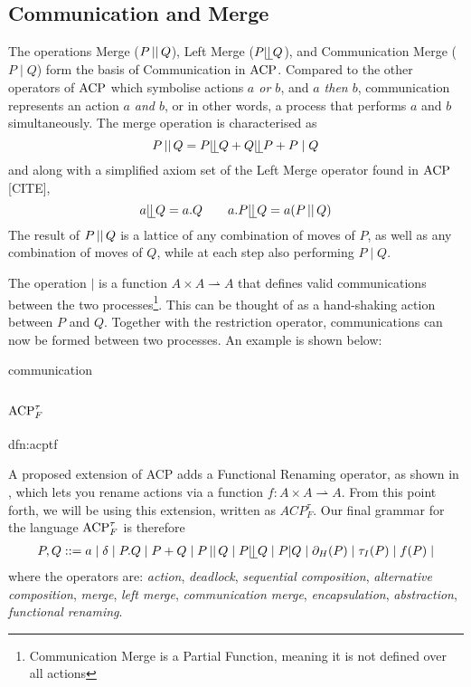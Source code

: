\documentclass[../hons_project.tex]{subfiles}
\begin{document}
\subsection{Communication and Merge}\label{ssec:acp-communication}
The operations Merge ($P \merge Q$), Left Merge ($P \leftmerge Q$), and Communication Merge ($P \mid Q$) form the basis of Communication in $\acp$. Compared to the other operators of $\acp$ which symbolise actions \textit{$a$ or $b$}, and \textit{$a$ then $b$}, communication represents an action \textit{$a$ and $b$}, or in other words, a process that performs $a$ and $b$ simultaneously. The merge operation is characterised as 
\[P \merge Q = P \leftmerge Q + Q \leftmerge P + P \mid Q\]
and along with a simplified axiom set of the Left Merge operator found in $\acp$ [CITE], 
\[a \leftmerge Q = a.Q \qquad a.P \leftmerge Q = a(P \merge Q)\]
The result of $P \merge Q$ is a lattice of any combination of moves of $P$, as well as any combination of moves of $Q$, while at each step also performing $P \mid Q$. 

The operation $\mid$ is a function $A \times A \rightharpoonup A$ that defines valid communications between the two processes\footnote{Communication Merge is a Partial Function, meaning it is not defined over all actions}. This can be thought of as a hand-shaking action between $P$ and $Q$. Together with the restriction operator, communications can now be formed between two processes. An example is shown below:

{communication}

\subsection{\texorpdfstring{$\acptf$}{acptf}}

\begin{dfn}{dfn:acptf}{}
	
A proposed extension of ACP adds a Functional Renaming operator, as shown in \cite{vanglabbeekExpressivenessACP1995}, which lets you rename actions via a function $f : A \times A \rightharpoonup A$. From this point forth, we will be using this extension, written as $ACP^{\tau}_{F}$. Our final grammar for the language $\acptf$ is therefore
\begin{align*}
   P, Q ::= a \mid \delta \mid P . Q \mid P + Q \mid P \merge Q \mid P \leftmerge Q \mid P | Q \mid \restrict(P) \mid \abtau(P) \mid f(P) \mid
\end{align*}
where the operators are: \textit{action}, \textit{deadlock}, \textit{sequential composition}, \textit{alternative composition},  \textit{merge}, \textit{left merge}, \textit{communication merge}, \textit{encapsulation}, \textit{abstraction}, \textit{functional renaming}.
\end{dfn}
\end{document}
